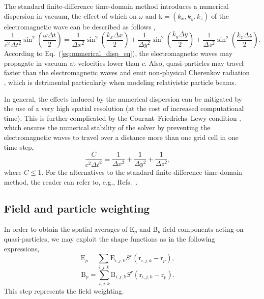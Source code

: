 \documentclass[10pt, a4paper, twoside, openright]{report}
\renewcommand{\vec}[1]{\boldsymbol{\mathrm{#1}}}
\begin{document}
The standard finite-difference time-domain method introduces a numerical dispersion in vacuum, the effect of which on $ \omega $ and $ \vec{k} = \left( k_x, k_y, k_z \right) $ of the electromagnetic wave can be described as follows \cite{Vay2011}, 
\begin{equation}\label{eq:numerical_disp_eq}
	\frac{1}{c^2 \Delta t^2} \sin^2 \left(\frac{\omega \Delta t}{2}\right) = \frac{1}{\Delta x^2} \sin^2 \left(\frac{k_x \Delta x}{2}\right) + \frac{1}{\Delta y^2} \sin^2 \left(\frac{k_y \Delta y}{2}\right) + \frac{1}{\Delta z^2} \sin^2 \left(\frac{k_z \Delta z}{2}\right).
\end{equation}
According to Eq.~(\ref{eq:numerical_disp_eq}), the electromagnetic waves may propagate in vacuum at velocities lower than $ c $. Also, quasi-particles may travel faster than the electromagnetic waves and emit non-physical Cherenkov radiation \cite{Godfrey1974}, which is detrimental particularly when modeling relativistic particle beams. 

In general, the effects induced by the numerical dispersion can be mitigated by the use of a very high spatial resolution (at the cost of increased computational time). This is further complicated by the Courant--Friedrichs--Lewy condition \cite{Courant1928}, which ensures the numerical stability of the solver by preventing the electromagnetic waves to travel over a distance more than one grid cell in one time step,
\begin{equation}\label{eq:cfl}
	\frac{C}{c^{2} \Delta t^{2}} = \frac{1}{\Delta x^{2}} + \frac{1}{\Delta y^{2}} + \frac{1}{\Delta z^{2}},
\end{equation}
where $ C \leq 1 $. For the alternatives to the standard finite-difference time-domain method, the reader can refer to, e.g., Refs.~.

\subsection{Field and particle weighting}

In order to obtain the spatial averages of $ \vec{E}_{p} $ and $ \vec{B}_{p} $ field components acting on quasi-particles, we may exploit the shape functions as in the following expressions,
\begin{equation}\label{eq:E_weighting}
	\vec{E}_{p} = \sum_{i, j, k} \vec{E}_{i, j, k} S^r \left( \vec{r}_{i, j, k} - \vec{r}_{p} \right),
\end{equation}
\begin{equation}\label{eq:B_weighting}
	\vec{B}_{p} = \sum_{i, j, k} \vec{B}_{i, j, k} S^r \left( \vec{r}_{i, j, k} - \vec{r}_{p} \right).
\end{equation}
This step represents the field weighting.
\end{document}
